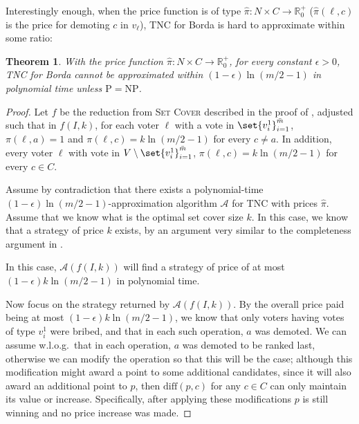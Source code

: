\documentclass[letterpaper]{article} %
\newtheorem{theorem}{Theorem}
\newcommand{\preals}{\mathbb{R}^{+}_{0}}
\newcommand{\SC}{\textsc{Set Cover}}
\newcommand{\SB}{\textsc{TNC}}
\newcommand{\abs}[1]{\lvert{#1}\rvert}
\newcommand{\diff}{\mathrm{diff}}
\newcommand{\NP}{\mathrm{NP}}
\newcommand{\Pclass}{\mathrm{P}}
\begin{document}
Interestingly enough, when the price function is of type $\hat{\pi}\colon N \times C \to \preals$  ($\hat{\pi}(\ell,c)$ is the price for demoting $c$ in $v_\ell$), \SB{} for Borda is hard to approximate within some ratio:
\begin{theorem}
With the price function $\hat{\pi}\colon N \times C \to \preals$, for every constant $\epsilon >0$, \SB{} for Borda cannot be approximated within $(1-\epsilon) \ln (m/2-1)$ in polynomial time unless $\Pclass = \NP$.
\end{theorem}
\begin{proof}
Let $f$ be the reduction from \SC{} described in the proof of  , adjusted such that in $f(I,k)$,  for each voter $\ell$ with a vote in $\set{v_i^1}_{i=1}^{\bar{m}}$,  $\pi(\ell,a) = 1$ and $\pi(\ell,c) = k\ln (m/2-1)$ for every $c \neq a$. In addition, every voter $\ell$ with vote in $V \setminus \set{v_i^1}_{i=1}^{\bar{m}}$,  $\pi(\ell,c) = k\ln (m/2-1)$ for every $c \in C$.

Assume by contradiction that there exists a polynomial-time $(1-\epsilon) \ln (m/2-1)$-approximation algorithm $\mathcal{A}$ for \SB{} with prices $\hat{\pi}$.
Assume that we know what is the optimal set cover size $k$.
In this case, we know that a strategy of price $k$ exists, by an argument very similar to the completeness argument in . %

In this case, $\mathcal{A}(f(I,k))$ will find a strategy of price of at most $(1-\epsilon) k \ln (m/2-1)$ in polynomial time.

Now focus on the strategy returned by $\mathcal{A}(f(I,k))$. By the overall price paid being at most  $ (1-\epsilon) k\ln (m/2-1)$, we know that only voters having votes of type $v_i^1$ were bribed, and that in each such operation, $a$ was demoted. We can assume w.l.o.g.\ that in each operation, $a$ was demoted  to be ranked last, otherwise we can modify the operation so that this will be the case; although this modification might award a point to some additional candidates, since it will also award an additional point to $p$, then $\diff(p,c)$ for any $c \in C$ can only maintain its value or increase. Specifically, after applying these modifications $p$ is still winning and no price increase was made.


\end{proof}
\end{document}
